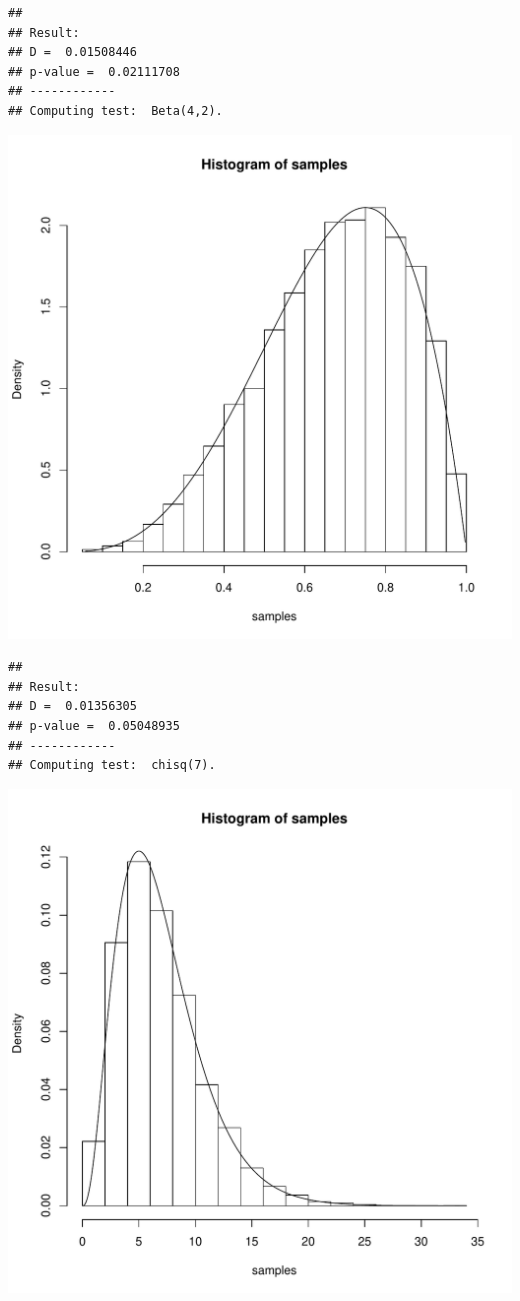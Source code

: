 \documentclass{llncs}\usepackage[]{graphicx}\usepackage[]{color}
\makeatletter
\def\maxwidth{ %
  \ifdim\Gin@nat@width>\linewidth
    \linewidth
  \else
    \Gin@nat@width
  \fi
}
\newenvironment{kframe}{%
 \def\at@end@of@kframe{}%
 \ifinner\ifhmode%
  \def\at@end@of@kframe{\end{minipage}}%
  \begin{minipage}{\columnwidth}%
 \fi\fi%
 \def\FrameCommand##1{\hskip\@totalleftmargin \hskip-\fboxsep
 \colorbox{shadecolor}{##1}\hskip-\fboxsep
     \hskip-\linewidth \hskip-\@totalleftmargin \hskip\columnwidth}%
 \MakeFramed {\advance\hsize-\width
   \@totalleftmargin\z@ \linewidth\hsize
   \@setminipage}}%
 {\par\unskip\endMakeFramed%
 \at@end@of@kframe}
\newenvironment{knitrout}{}{} %
\makeatother
\begin{document}
\begin{knitrout}
\begin{kframe}\begin{lstlisting}[basicstyle=\ttfamily,breaklines=true]
## 
## Result:
## D =  0.01508446 
## p-value =  0.02111708 
## ------------
## Computing test:  Beta(4,2).
\end{lstlisting}
\end{kframe}
\includegraphics[width=\maxwidth]{figure/Rt-6} 
\begin{kframe}\begin{lstlisting}[basicstyle=\ttfamily,breaklines=true]
## 
## Result:
## D =  0.01356305 
## p-value =  0.05048935 
## ------------
## Computing test:  chisq(7).
\end{lstlisting}
\end{kframe}
\includegraphics[width=\maxwidth]{figure/Rt-7} 

\end{knitrout}
\end{document}
